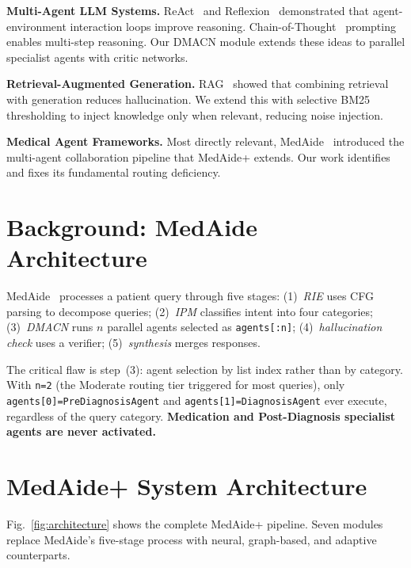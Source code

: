 \documentclass[conference]{IEEEtran}
\begin{document}
\textbf{Multi-Agent LLM Systems.} ReAct~\cite{yao2023react} and Reflexion~\cite{shinn2023reflexion} demonstrated that agent-environment interaction loops improve reasoning. Chain-of-Thought~\cite{wei2022cot} prompting enables multi-step reasoning. Our DMACN module extends these ideas to parallel specialist agents with critic networks.

\textbf{Retrieval-Augmented Generation.} RAG~\cite{lewis2020rag} showed that combining retrieval with generation reduces hallucination. We extend this with selective BM25~\cite{robertson2009bm25} thresholding to inject knowledge only when relevant, reducing noise injection.

\textbf{Medical Agent Frameworks.} Most directly relevant, MedAide~\cite{yang2025medaide} introduced the multi-agent collaboration pipeline that MedAide+ extends. Our work identifies and fixes its fundamental routing deficiency.

\section{Background: MedAide Architecture}
\label{sec:background}

MedAide~\cite{yang2025medaide} processes a patient query through five stages: (1)~\textit{RIE} uses CFG parsing to decompose queries; (2)~\textit{IPM} classifies intent into four categories; (3)~\textit{DMACN} runs $n$ parallel agents selected as \texttt{agents[:n]}; (4)~\textit{hallucination check} uses a verifier; (5)~\textit{synthesis} merges responses.

The critical flaw is step~(3): agent selection by list index rather than by category. With \texttt{n=2} (the Moderate routing tier triggered for most queries), only \texttt{agents[0]=PreDiagnosisAgent} and \texttt{agents[1]=DiagnosisAgent} ever execute, regardless of the query category. \textbf{Medication and Post-Diagnosis specialist agents are never activated.}

\section{MedAide+ System Architecture}
\label{sec:architecture}

Fig.~\ref{fig:architecture} shows the complete MedAide+ pipeline. Seven modules replace MedAide's five-stage process with neural, graph-based, and adaptive counterparts.
\end{document}
